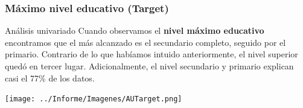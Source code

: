 \documentclass[pdf]{beamer}
\begin{document}



           
           
           
 

           
           
           
           
    \subsubsection{Máximo nivel educativo (Target)}
    
\begin{frame}{Análisis univariado}
    Cuando observamos el \textbf{nivel máximo educativo} encontramos que el más alcanzado es el secundario completo, seguido por el primario. Contrario de lo que habíamos intuido anteriormente, el nivel superior quedó en tercer lugar. Adicionalmente, el nivel secundario y primario explican casi el 77\% de los datos.
  
    \begin{center}
        \texttt{[image: ../Informe/Imagenes/AUTarget.png]}    
    \end{center}

\end{frame}
    
\end{document}
